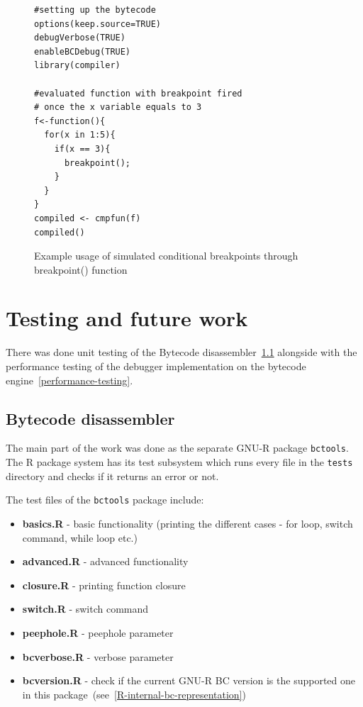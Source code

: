 \documentclass[thesis=M,english]{FITthesis}[2018/10/20]
\newcommand{\code}[1]{\texttt{#1}}
\begin{document}
{\begin{figure}[H]
\begin{lstlisting}
#setting up the bytecode
options(keep.source=TRUE)
debugVerbose(TRUE)
enableBCDebug(TRUE)
library(compiler)

#evaluated function with breakpoint fired
# once the x variable equals to 3
f<-function(){
  for(x in 1:5){
    if(x == 3){
      breakpoint();
    }
  }
}
compiled <- cmpfun(f)
compiled()
\end{lstlisting}
	\caption{Example usage of simulated conditional breakpoints through breakpoint() function}\label{fig:example-of-conditional-breakpoints}
\end{figure}

\chapter{Testing and future work}\label{testing-and-future-work}

There was done unit testing of the Bytecode disassembler~\ref{bytecode-disassembler-testing} alongside with the performance testing of the debugger implementation on the bytecode engine~\ref{performance-testing}.

\section{Bytecode disassembler}\label{bytecode-disassembler-testing}

The main part of the work was done as the separate GNU-R package \code{bctools}. The R package system has its test subsystem which runs every file in the \code{tests} directory and checks if it returns an error or not.

The test files of the \code{bctools} package include:
\begin{itemize}
	\item \textbf{basics.R} - basic functionality (printing the different cases - for loop, switch command, while loop etc.)
	\item \textbf{advanced.R} - advanced functionality
	\item \textbf{closure.R} - printing function closure
	\item \textbf{switch.R} - switch command
	\item \textbf{peephole.R} - peephole parameter
	\item \textbf{bcverbose.R} - verbose parameter
	\item \textbf{bcversion.R} - check if the current GNU-R BC version is the supported one in this package~(see~\ref{R-internal-bc-representation})
\end{itemize}

}
\end{document}
